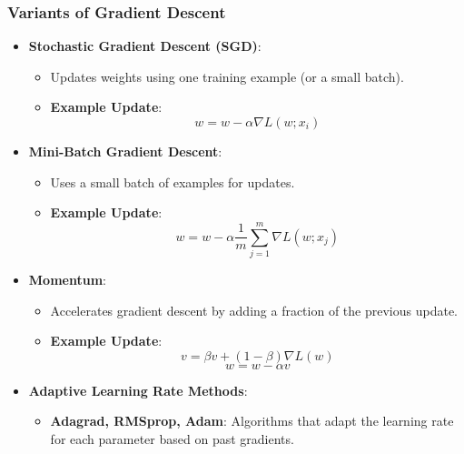 \documentclass[aspectratio=169]{beamer}
\begin{document}
\begin{frame}[fragile]
    \frametitle{Variants of Gradient Descent}
    \begin{itemize}
        \item \textbf{Stochastic Gradient Descent (SGD)}:
            \begin{itemize}
                \item Updates weights using one training example (or a small batch).
                \item \textbf{Example Update}:
                \begin{equation}
                w = w - \alpha \nabla L(w; x_i)
                \end{equation}
            \end{itemize}

        \item \textbf{Mini-Batch Gradient Descent}:
            \begin{itemize}
                \item Uses a small batch of examples for updates.
                \item \textbf{Example Update}:
                \begin{equation}
                w = w - \alpha \frac{1}{m} \sum_{j=1}^{m} \nabla L(w; x_j)
                \end{equation}
            \end{itemize}

        \item \textbf{Momentum}:
            \begin{itemize}
                \item Accelerates gradient descent by adding a fraction of the previous update.
                \item \textbf{Example Update}:
                \begin{equation}
                v = \beta v + (1 - \beta) \nabla L(w)
                \end{equation}
                \begin{equation}
                w = w - \alpha v
                \end{equation}
            \end{itemize}

        \item \textbf{Adaptive Learning Rate Methods}:
            \begin{itemize}
                \item \textbf{Adagrad, RMSprop, Adam}: Algorithms that adapt the learning rate for each parameter based on past gradients.
            \end{itemize}
    \end{itemize}
\end{frame}
\end{document}
